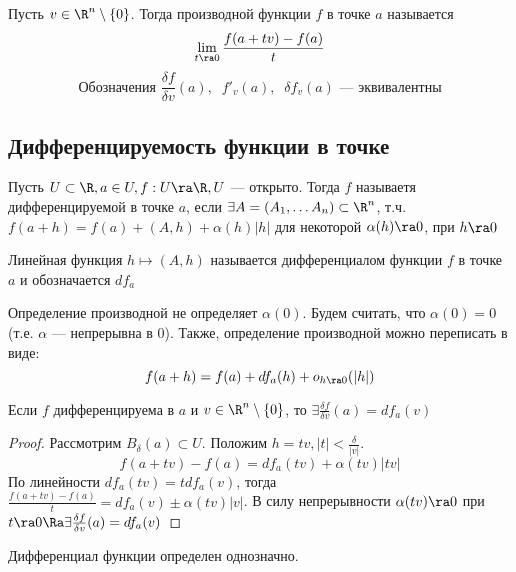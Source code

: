 \begin{definition}
    Пусть \(v \in \R^n \setminus \{0\}\). Тогда производной функции \(f\) в точке \(a\) называется 
    \[\lim_{t \ra 0} \frac{f(a + tv) - f(a)}{t}\]
    \[\text{Обозначения }\frac{\delta f}{\delta v}(a),\;\;f'_v(a),\;\;\delta f_v(a)\text{ --- эквивалентны}\]
\end{definition}

\subsection{Дифференцируемость функции в точке}
\begin{definition}
    Пусть \(U \subset \R, a \in U, f: U \ra \R, U\) --- открыто. Тогда \(f\) называетя дифференцируемой в точке \(a\), если \(\exists A = (A_1, \dots A_n) \subset \R^n\), т.ч. \(f(a + h) = f(a) + (A, h) + \alpha(h)|h|\) для некоторой \(\alpha(h) \ra 0\), при \(h \ra 0\)
\end{definition}

\begin{definition}
    Линейная функция \(h \mapsto (A, h)\) называется дифференциалом функции \(f\) в точке \(a\) и обозначается \(df_a\)
\end{definition}

\begin{note}
    Определение производной не определяет \(\alpha(0)\). Будем считать, что \(\alpha(0) = 0\) (т.е. \(\alpha\) --- непрерывна в \(0\)). Также, определение производной можно переписать в виде:
    \[f(a + h) = f(a) + df_a(h) + o_{h \ra 0}(|h|)\]
\end{note}

\begin{theorem}
    Если \(f\) дифференцируема в \(a\) и \(v \in \R^n \setminus \{0\}\), то \(\exists \frac{\delta f}{\delta v}(a) = df_a(v)\)
\end{theorem}
\begin{proof}
    Рассмотрим \(B_\delta(a) \subset U\). Положим \(h = tv, |t| < \frac{\delta}{|v|}\).
    \[f(a + tv) - f(a) = df_a(tv) + \alpha(tv)|tv|\]
    По линейности \(df_a(tv) = tdf_a(v)\), тогда \(\frac{f(a + tv) - f(a)}{t} = df_a(v) \pm \alpha(tv)|v|\). В силу непрерывности \(\alpha(tv) \ra 0\) при \(t \ra 0 \Ra \exists \frac{\delta f}{\delta v}(a) = df_a(v)\)
\end{proof}

\begin{corollary}
    Дифференциал функции определен однозначно.
\end{corollary}
